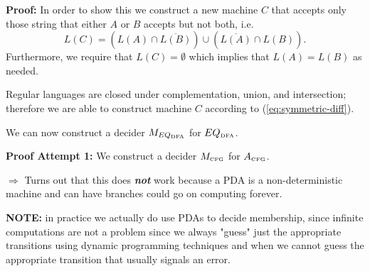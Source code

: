 \documentclass[a4paper,blends,pdf,colorBG,slideColor]{prosper}
\begin{document}
{\small
{}

{\bf Proof:}  In order to show this we construct a new machine $C$ that accepts only
those string that either $A$ or $B$ accepts but not both, i.e.
\begin{equation}
\label{eq:symmetric-diff}
L(C) = (L(A) \cap \overline{L(B)}) \cup (\overline{L(A)} \cap L(B)).
\end{equation}
Furthermore, we require that $L(C) = \emptyset$ which implies that $L(A) = L(B)$ as
needed.

Regular languages are closed under complementation, union, and intersection; therefore
we are able to construct machine $C$ according to (\ref{eq:symmetric-diff}).

We can now construct a decider $M_{EQ_{\mbox{\tiny DFA}}}$ for  $EQ_{\mbox{\tiny DFA}}$.

}
\es



{\small
{}

{\bf Proof Attempt 1:} We construct a decider $M_{\mbox{\tiny CFG}}$ for  $A_{\mbox{\tiny CFG}}$.


$\Rightarrow$ Turns out that this does {\bf\em not} work because a PDA is a non-deterministic machine
and can have branches could go on computing forever.

{\bf NOTE:} in practice we actually do use PDAs to decide membership, since infinite
computations are not a problem since we always "guess" just the appropriate transitions
using dynamic programming techniques and when we cannot guess the appropriate transition that usually signals an error.
}
\es
\end{document}
